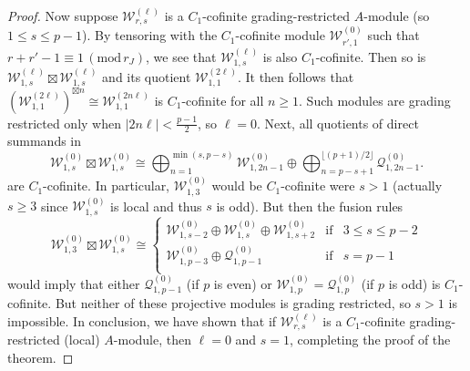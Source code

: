 \documentclass[11pt, reqno]{amsart}
\theoremstyle{definition}\newtheorem{defi}[thm]{Definition}
\theoremstyle{definition}\newtheorem{rem}[thm]{Remark}
\theoremstyle{definition}\newtheorem{exam}[thm]{Example}
\theoremstyle{definition}\newtheorem{assum}[thm]{Assumption}
\newcommand{\cW}{\mathcal{W}}
\newcommand{\cQ}{\mathcal{Q}}
\newcommand{\tens}{\boxtimes}
\begin{document}
\begin{proof}
Now suppose $\cW_{r,s}^{(\ell)}$ is a $C_1$-cofinite grading-restricted $A$-module (so $1\leq s\leq p-1$). By tensoring with the $C_1$-cofinite module $\cW_{r',1}^{(0)}$ such that $r+r'-1\equiv 1\,(\mathrm{mod}\,r_J)$, we see that $\cW_{1,s}^{(\ell)}$ is also $C_1$-cofinite. Then so is $\cW_{1,s}^{(\ell)}\tens\cW_{1,s}^{(\ell)}$ and its quotient $\cW_{1,1}^{(2\ell)}$. It then follows that $(\cW_{1,1}^{(2\ell)})^{\tens n} \cong \cW_{1,1}^{(2n\ell)}$ is $C_1$-cofinite for all $n\geq 1$. Such modules are grading restricted only when $\vert 2n\ell\vert < \frac{p-1}{2}$, so $\ell=0$. Next, all quotients of direct summands in
\begin{equation*}
\cW_{1,s}^{(0)}\tens\cW_{1,s}^{(0)}\cong \bigoplus_{n=1}^{\min(s, p-s)} \cW^{(0)}_{1,2n-1}\oplus\bigoplus_{n=p-s+1}^{\lfloor (p+1)/2\rfloor} \cQ^{(0)}_{1,2n-1}.
\end{equation*}
are $C_1$-cofinite. In particular, $\cW_{1,3}^{(0)}$ would be $C_1$-cofinite were $s>1$ (actually $s\geq 3$ since $\cW_{1,s}^{(0)}$ is local and thus $s$ is odd). But then the fusion rules
\begin{equation*}
\cW_{1,3}^{(0)}\tens\cW_{1,s}^{(0)}\cong\left\lbrace\begin{array}{lll}
\cW_{1,s-2}^{(0)}\oplus\cW_{1,s}^{(0)}\oplus\cW_{1,s+2}^{(0)} & \text{if} & 3\leq s\leq p-2\\
\cW_{1,p-3}^{(0)}\oplus\cQ_{1,p-1}^{(0)} & \text{if} & s=p-1\\ 
\end{array}\right.
\end{equation*}
would imply that either $\cQ_{1,p-1}^{(0)}$ (if $p$ is even) or $\cW_{1,p}^{(0)}=\cQ_{1,p}^{(0)}$ (if $p$ is odd) is $C_1$-cofinite. But neither of these projective modules is grading restricted, so $s>1$ is impossible. In conclusion, we have shown that if $\cW_{r,s}^{(\ell)}$ is a $C_1$-cofinite grading-restricted (local) $A$-module, then $\ell=0$ and $s=1$, completing the proof of the theorem.
 \end{proof}
\end{document}
